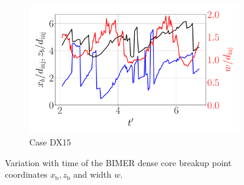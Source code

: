 \begin{figure}[ht]
\begin{subfigure}[b]{0.9\textwidth}
	\centering
   \includegraphics[scale=0.25]{./part3_applications/figures_ch8_resolved/results_dense_core_modeling/instant_xb_zb_w_DX15}
   \vspace*{-0.30in}
   \caption{Case DX15}
   \label{fig:instant_xb_zb_BIMER_w_DX15} 
\end{subfigure}
   \caption{Variation with time of the BIMER dense core breakup point coordinates $x_\mathrm{b}, z_\mathrm{b}$ and width $w$.}

\label{fig:BIMER_xb_zb_w_evolution}
\end{figure}


